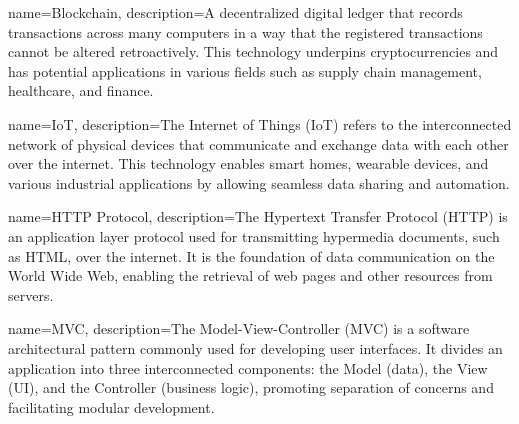 

{
    name=Blockchain,
    description={A decentralized digital ledger that records transactions across many computers in a way that the registered transactions cannot be altered retroactively. This technology underpins cryptocurrencies and has potential applications in various fields such as supply chain management, healthcare, and finance.}
}

{
    name=IoT,
    description={The Internet of Things (IoT) refers to the interconnected network of physical devices that communicate and exchange data with each other over the internet. This technology enables smart homes, wearable devices, and various industrial applications by allowing seamless data sharing and automation.}
}

{
    name=HTTP Protocol,
    description={The Hypertext Transfer Protocol (HTTP) is an application layer protocol used for transmitting hypermedia documents, such as HTML, over the internet. It is the foundation of data communication on the World Wide Web, enabling the retrieval of web pages and other resources from servers.}
}

{
    name=MVC,
    description={The Model-View-Controller (MVC) is a software architectural pattern commonly used for developing user interfaces. It divides an application into three interconnected components: the Model (data), the View (UI), and the Controller (business logic), promoting separation of concerns and facilitating modular development.}
}

